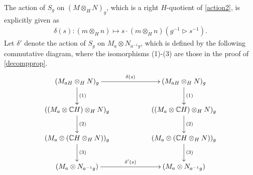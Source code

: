 \documentclass[a4paper, 10pt]{book}
\theoremstyle{definition}
\numberwithin{equation}{chapter}
\newcommand\hit{\triangleright}
\newcommand\inv{^{-1}}
\newcommand\ot{\otimes}
\newcommand\CC{\mathbb C}
\begin{document}
The action of $S_g$ on $(M\ot_H N)_g$, which is a right $H$-quotient of \eqref{action2}, is explicitly given as \begin{align}
	\delta(s): (m\ot_H n) \mapsto  s\cdot(m\ot_H n)(g\inv \hit s\inv).
\end{align}Let $\delta'$ denote the action of $S_g$ on $M_a\ot N_{a\inv g}$, which is defined by the following commutative diagram, where the isomorphisms (1)-(3) are those in the proof of \ref{decompprop}.
\begin{equation}\label{commdiag}
\xymatrix{
( M_{aH}\otimes_H N)_g\ar[d]^{(1)} \ar[rr]^{\delta(s)}& &( M_{aH}\otimes_H N)_g\ar[d]^{(1)} \\ (( M_a \otimes \CC H) \otimes_H N)_g\ar[d]^{(2)} & &(( M_a \otimes \CC H) \otimes_H N)_g\ar[d]^{(2)} \\ ( M_a \otimes (\CC H \otimes_H N))_g\ar[d]^{(3)} & &( M_a \otimes (\CC H \otimes_H N))_g\ar[d]^{(3)}\\ 
( M_a \otimes N_{a\inv g})\ar[rr]^{\delta'(s)} & & ( M_a \otimes N_{a\inv g})\\
}\end{equation}
\end{document}
